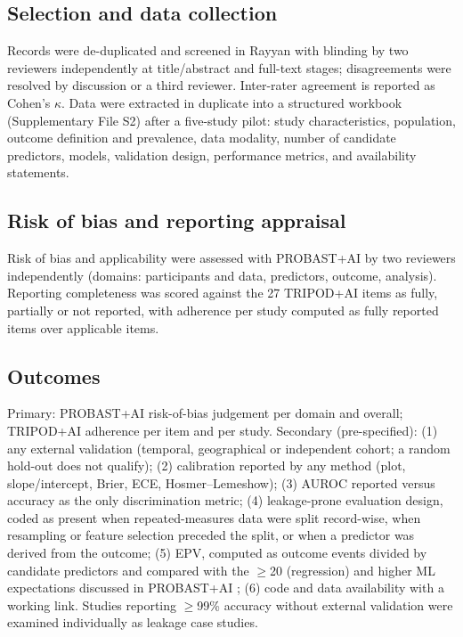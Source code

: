 \documentclass[11pt,a4paper]{article}
\begin{document}
\subsection{Selection and data collection}
Records were de-duplicated and screened in Rayyan with blinding by two reviewers independently at
title/abstract and full-text stages; disagreements were resolved by discussion or a third
reviewer. Inter-rater agreement is reported as Cohen's $\kappa$. Data were extracted in duplicate
into a structured workbook (Supplementary File S2) after a five-study pilot: study characteristics,
population, outcome definition and prevalence, data modality, number of candidate predictors,
models, validation design, performance metrics, and availability statements.

\subsection{Risk of bias and reporting appraisal}
Risk of bias and applicability were assessed with PROBAST+AI \cite{moons2025} by two reviewers
independently (domains: participants and data, predictors, outcome, analysis). Reporting
completeness was scored against the 27 TRIPOD+AI items \cite{collins2024} as fully, partially or
not reported, with adherence per study computed as fully reported items over applicable items.

\subsection{Outcomes}
Primary: PROBAST+AI risk-of-bias judgement per domain and overall; TRIPOD+AI adherence per item and
per study. Secondary (pre-specified): (1) any external validation (temporal, geographical or
independent cohort; a random hold-out does not qualify); (2) calibration reported by any method
(plot, slope/intercept, Brier, ECE, Hosmer--Lemeshow); (3) AUROC reported versus accuracy as the
only discrimination metric; (4) leakage-prone evaluation design, coded as present when
repeated-measures data were split record-wise, when resampling or feature selection preceded the
split, or when a predictor was derived from the outcome; (5) EPV, computed as outcome events
divided by candidate predictors and compared with the $\geq$20 (regression) and higher ML
expectations discussed in PROBAST+AI \cite{moons2025}; (6) code and data availability with a
working link. Studies reporting $\geq$99\% accuracy without external validation were examined
individually as leakage case studies.
\end{document}
